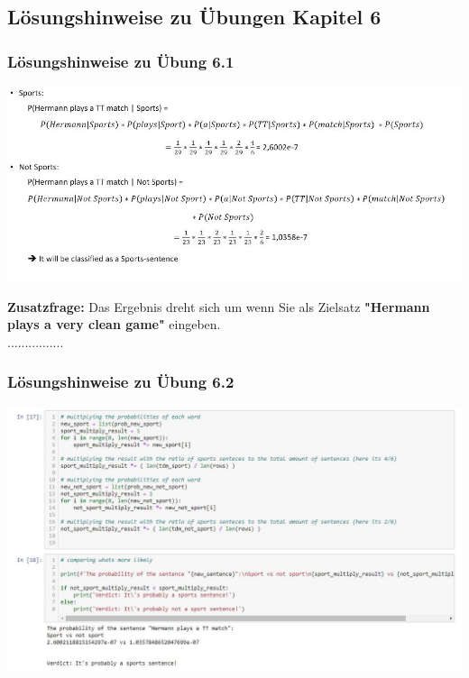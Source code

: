 \documentclass[12pt]{article}
\begin{document}
\subsection{Lösungshinweise zu Übungen Kapitel 6}

\subsubsection{Lösungshinweise zu Übung 6.1}

\begin{center} 
\includegraphics[width=1.1\textwidth]{Naive-Bayes-Ueb61_Hinweis}
\end{center}
\textbf{Zusatzfrage:} Das Ergebnis dreht sich um wenn Sie als Zielsatz \textbf{"Hermann plays a very clean game"} eingeben.\\................

\subsubsection{Lösungshinweise zu Übung 6.2}

\begin{center} 
\includegraphics[width=1.1\textwidth]{Naive-Bayes-Ueb62_Hinweis}
\end{center}
\end{document}
